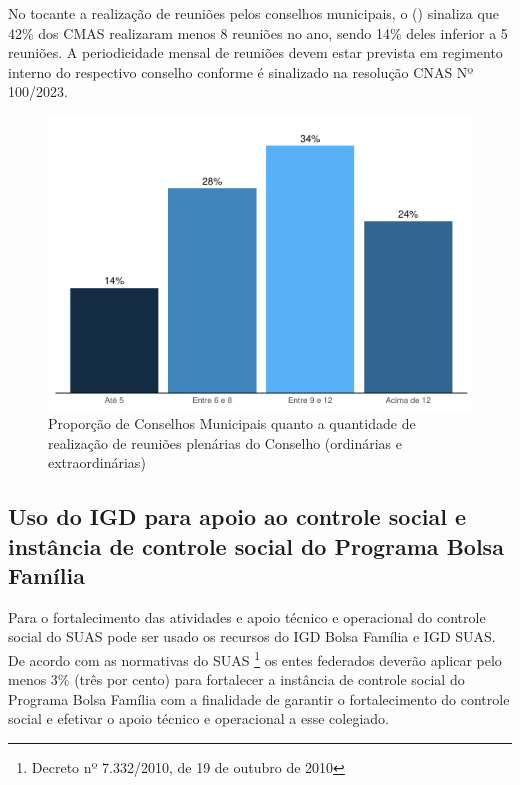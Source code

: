 \documentclass[
  brazilian]{report}
\begin{document}
No tocante a realização de reuniões pelos conselhos municipais, o
() sinaliza que 42\% dos CMAS realizaram menos
8 reuniões no ano, sendo 14\% deles inferior a 5 reuniões. A
periodicidade mensal de reuniões devem estar prevista em regimento
interno do respectivo conselho conforme é sinalizado na resolução CNAS
Nº 100/2023.

\begin{figure}
\includegraphics{Censo-SUAS-2022_files/figure-latex/qtdcmas_reuniao-1} \caption[Proporção de Conselhos Municipais quanto a quantidade de realização de reuniões plenárias do Conselho (ordinárias e extraordinárias)]{Proporção de Conselhos Municipais quanto a quantidade de realização de reuniões plenárias do Conselho (ordinárias e extraordinárias)}\label{fig:qtdcmas_reuniao}
\end{figure}

\hypertarget{uso-do-igd-para-apoio-ao-controle-social-e-instuxe2ncia-de-controle-social-do-programa-bolsa-famuxedlia}{%
\subsection{Uso do IGD para apoio ao controle social e instância de
controle social do Programa Bolsa
Família}\label{uso-do-igd-para-apoio-ao-controle-social-e-instuxe2ncia-de-controle-social-do-programa-bolsa-famuxedlia}}

Para o fortalecimento das atividades e apoio técnico e operacional do
controle social do SUAS pode ser usado os recursos do IGD Bolsa Família
e IGD SUAS. De acordo com as normativas do SUAS
\footnote{Decreto nº 7.332/2010, de 19 de outubro de 2010} os entes
federados deverão aplicar pelo menos 3\% (três por cento) para
fortalecer a instância de controle social do Programa Bolsa Família com
a finalidade de garantir o fortalecimento do controle social e efetivar
o apoio técnico e operacional a esse colegiado.
\end{document}
